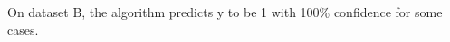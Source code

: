 \begin{answer}
On dataset B, the algorithm predicts y to be 1 with 100\% confidence for some cases.
\end{answer}
